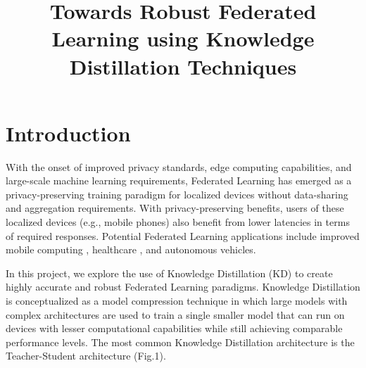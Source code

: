 \documentclass[conference]{IEEEtran}
\begin{document}
\title{Towards Robust Federated Learning using Knowledge Distillation Techniques\\}

\author{
\and
{}
}
\maketitle

\section{Introduction}
With the onset of improved privacy standards, edge computing capabilities, and large-scale machine learning requirements, Federated Learning has emerged as a privacy-preserving training paradigm for localized devices without data-sharing and aggregation requirements. With privacy-preserving benefits, users of these localized devices (e.g., mobile phones) also benefit from lower latencies in terms of required responses. Potential Federated Learning applications include improved mobile computing \cite{b1}, healthcare \cite{b2}, and autonomous vehicles.

In this project, we explore the use of Knowledge Distillation (KD) to create highly accurate and robust Federated Learning paradigms. Knowledge Distillation is conceptualized as a model compression technique in which large models with complex architectures are used to train a single smaller model that can run on devices with lesser computational capabilities while still achieving comparable performance levels. The most common Knowledge Distillation architecture is the Teacher-Student architecture (Fig.1).
\end{document}
